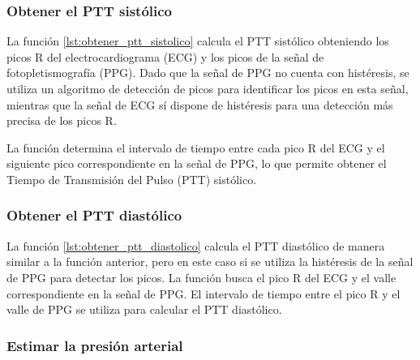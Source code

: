         

        \subsubsection{Obtener el PTT sistólico}

        La función \ref{lst:obtener_ptt_sistolico} calcula el PTT sistólico obteniendo los picos R del electrocardiograma (ECG) y los picos de la señal de fotopletismografía (PPG). Dado que la señal de PPG no cuenta con histéresis, se utiliza un algoritmo de detección de picos para identificar los picos en esta señal, mientras que la señal de ECG sí dispone de histéresis para una detección más precisa de los picos R.

        La función determina el intervalo de tiempo entre cada pico R del ECG y el siguiente pico correspondiente en la señal de PPG, lo que permite obtener el Tiempo de Transmisión del Pulso (PTT) sistólico.


        

        \subsubsection{Obtener el PTT diastólico}

        La función \ref{lst:obtener_ptt_diastolico} calcula el PTT diastólico de manera similar a la función anterior, pero en este caso si se utiliza la histéresis de la señal de PPG para detectar los picos. La función busca el pico R del ECG y el valle correspondiente en la señal de PPG. El intervalo de tiempo entre el pico R y el valle de PPG se utiliza para calcular el PTT diastólico.

        

        \subsubsection{Estimar la presión arterial}

